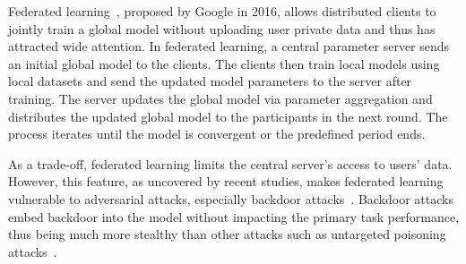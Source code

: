 Federated learning~\cite{googlefederation}, proposed by Google in 2016, allows distributed clients to jointly train a global model without uploading user private data and thus has attracted wide attention. In federated learning, a central parameter server sends an initial global model to the clients. The clients then train local models using local datasets and send the updated model parameters to the server after training. The server updates the global model via parameter aggregation and distributes the updated global model to the participants in the next round. The process iterates until the model is convergent or the predefined period ends.


As a trade-off, federated learning limits the central server's access to users' data. However, this feature, as uncovered by recent studies, makes federated learning vulnerable to adversarial attacks, especially backdoor attacks~\cite{BadNets,Trojaning}. Backdoor attacks embed backdoor into the model without impacting the primary task performance, thus being much more stealthy than other attacks such as untargeted poisoning attacks~\cite{untarget}. %


